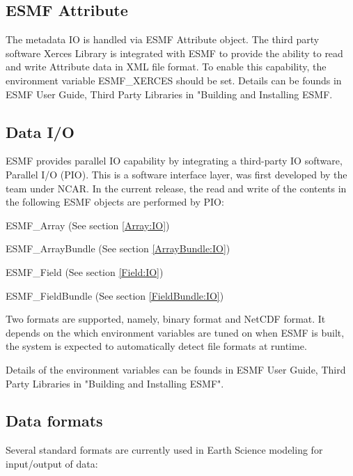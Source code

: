 \subsection{ESMF Attribute}

The metadata IO is handled via ESMF Attribute object. The third
party software Xerces Library is integrated with ESMF to provide
the ability to read and write Attribute data in XML file format.
To enable this capability, the environment variable ESMF\_XERCES should be
set. Details can be founds in ESMF User Guide, Third Party Libraries
in "Building and Installing ESMF.


\subsection{Data I/O}

ESMF provides parallel IO capability by integrating a third-party IO
software, Parallel I/O (PIO). This is a software interface layer, was 
first developed by the team under 
NCAR. In the current release, the read and write of the
contents in the following ESMF objects are performed by PIO:

\begin{description}
\item ESMF\_Array  (See section \ref{Array:IO})
\item ESMF\_ArrayBundle  (See section \ref{ArrayBundle:IO})
\item ESMF\_Field  (See section \ref{Field:IO})
\item ESMF\_FieldBundle  (See section \ref{FieldBundle:IO})
\end{description}

Two formats are supported, namely, binary format and NetCDF format.  
It depends on the which environment variables are tuned on when ESMF is built,
the system is expected to automatically detect file formats at runtime.

Details of the environment variables can be founds in ESMF User Guide, 
Third Party Libraries in "Building and Installing ESMF".



\subsection{Data formats}

Several standard formats are currently used in Earth Science modeling
for input/output of data:

